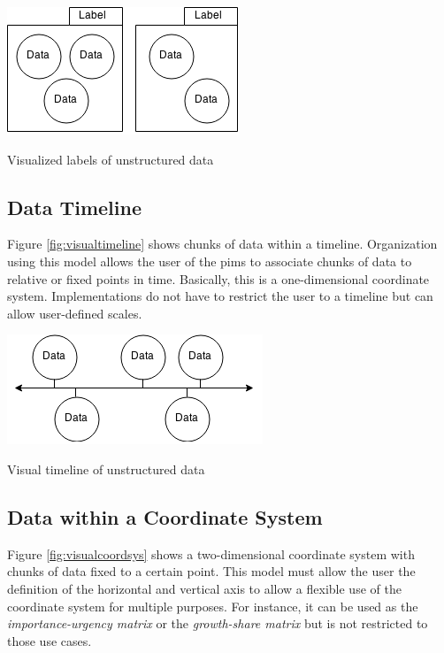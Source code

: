 \begin{flfigure}
  \centering
    \includegraphics[width=0.5\linewidth]{00_resources/data_labels.png}
    \caption{Visualized labels of unstructured data}
  \label{fig:visuallabels}
\end{flfigure}

\subsection{Data Timeline}

Figure \ref{fig:visualtimeline} shows chunks of data within a timeline.
Organization using this model allows the user of the \gls{pims} to associate
chunks of data to relative or fixed points in time. Basically, this is a
one-dimensional coordinate system. Implementations do not have to restrict the
user to a timeline but can allow user-defined scales.

\begin{flfigure}
  \centering
    \includegraphics[width=0.5\linewidth]{00_resources/data_timeline.png}
    \caption{Visual timeline of unstructured data}
  \label{fig:visualtimeline}
\end{flfigure}

\subsection{Data within a Coordinate System}

Figure \ref{fig:visualcoordsys} shows a two-dimensional coordinate system with
chunks of data fixed to a certain point. This model must allow the user the
definition of the horizontal and vertical axis to allow a flexible use of the
coordinate system for multiple purposes. For instance, it can be used as the
\textit{importance-urgency matrix} or the \textit{growth-share matrix} but is
not restricted to those use cases.

